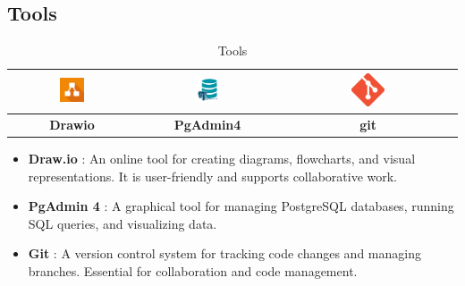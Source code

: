 \subsection{Tools}


\begin{table}[htbp]
    \centering
   
    \begin{tabular}{|c|c|c|}
        \hline
        \includegraphics[width=0.2\textwidth]{media/drawio.png} &
        \includegraphics[width=0.2\textwidth]{media/PgAdmin4.jpg} &
        \includegraphics[width=0.2\textwidth]{media/git.png} \\
        
        \hline
        \textbf{\cellcolor{gray!50}Drawio} & \textbf{\cellcolor{gray!50}PgAdmin4} & \textbf{\cellcolor{gray!50}git} \\
        \hline
    \end{tabular}
     \caption{Tools}
    \label{tab:Tools}
\end{table}

\begin{itemize}
    \item \textbf{Draw.io} \cite{drawio}: An online tool for creating diagrams, flowcharts, and visual representations. It is user-friendly and supports collaborative work.
    
    \item \textbf{PgAdmin 4} \cite{pgadmin}: A graphical tool for managing PostgreSQL databases, running SQL queries, and visualizing data.
    
    \item \textbf{Git} \cite{git}: A version control system for tracking code changes and managing branches. Essential for collaboration and code management.
\end{itemize}


